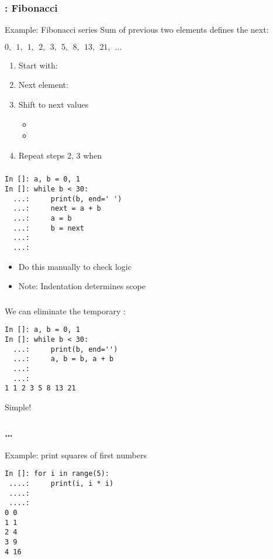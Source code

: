 \documentclass[14pt,compress]{beamer}
\begin{document}
\begin{frame}[fragile]
  \frametitle{: Fibonacci}
\begin{block}{Example: Fibonacci series}
  Sum of previous two elements defines the next:
  \begin{center}
    $0,\ \ 1,\ \ 1,\ \ 2,\ \ 3,\ \ 5,\ \ 8,\ \ 13,\ \ 21,\ \ ...$
  \end{center}
\end{block}
\pause
\begin{enumerate}
\item Start with: 
  \pause
\item Next element: 
  \pause
\item Shift  to next values
  \begin{itemize}
  \item {}
  \item {}
  \end{itemize}
  \pause
\item Repeat steps 2, 3 when 
\end{enumerate}
\end{frame}


\begin{frame}[fragile]
  \frametitle{}
  \begin{lstlisting}
In []: a, b = 0, 1
In []: while b < 30:
  ...:     print(b, end=' ')
  ...:     next = a + b
  ...:     a = b
  ...:     b = next
  ...:
  ...:
\end{lstlisting}
  \begin{itemize}
  \item Do this manually to check logic
  \item Note: Indentation determines scope
  \end{itemize}
\end{frame}

\begin{frame}[fragile]
  \frametitle{}
  We can eliminate the temporary :
  \begin{lstlisting}
In []: a, b = 0, 1
In []: while b < 30:
  ...:     print(b, end='')
  ...:     a, b = b, a + b
  ...:
  ...:
1 1 2 3 5 8 13 21
\end{lstlisting}
  Simple!
\end{frame}


\begin{frame}[fragile]
  \frametitle{ \ldots {}}
Example: print squares of first  numbers
  \begin{lstlisting}
In []: for i in range(5):
 ....:     print(i, i * i)
 ....:
 ....:
0 0
1 1
2 4
3 9
4 16
\end{lstlisting}
\end{frame}
\end{document}
